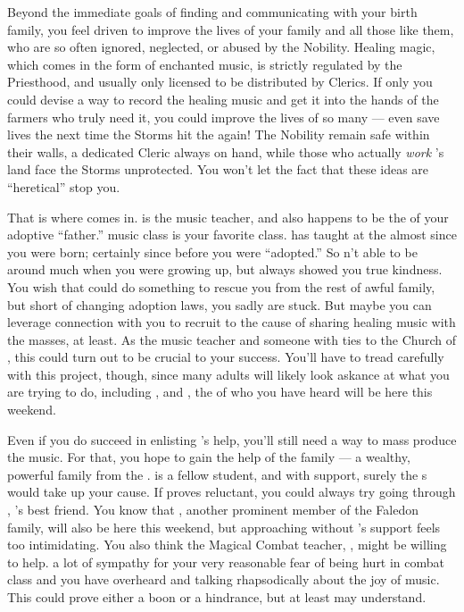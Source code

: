 \documentclass[char]{GL2020}
\begin{document}
Beyond the immediate goals of finding and communicating with your birth family, you feel driven to improve the lives of your family and all those like them, who are so often ignored, neglected, or abused by the Nobility. Healing magic, which comes in the form of enchanted music, is strictly regulated by the Priesthood, and usually only licensed to be distributed by Clerics. If only you could devise a way to record the healing music and get it into the hands of the farmers who truly need it, you could improve the lives of so many — even save lives the next time the Storms hit the \pFarm{} again! The Nobility remain safe within their walls, a dedicated Cleric always on hand, while those who actually \emph{work} \cFarmGod{}'s land face the Storms unprotected. You won't let the fact that these ideas are ``heretical'' stop you.

That is where \cMusic{\full} comes in. \cMusic{} is the music teacher, and also happens to be the \cMusic{\auncle} of your adoptive ``father.'' \cMusic{\Their} music class is your favorite class. \cMusic{} has taught at the \pSchool{} almost since you were born; certainly since before you were ``adopted.'' So \cMusic{\theywere}n’t able to be around much when you were growing up, but \cMusic{\they} always showed you true kindness. You wish that \cMusic{} could do something to rescue you from the rest of \cMusic{\their} awful family, but short of \cMusic{\them} changing adoption laws, you sadly are stuck. But maybe you can leverage \cMusic{\their} connection with you to recruit \cMusic{} to the cause of sharing healing music with the masses, at least. As the music teacher and someone with ties to the Church of \cFarmGod{}, this could turn out to be crucial to your success. You'll have to tread carefully with this project, though, since many adults will likely look askance at what you are trying to do, including \cMusic{} \cMusic{\themself}, and \cHedonist{\full}, the \cHedonist{\cleric} of \cFarmGod{} who you have heard will be here this weekend.

Even if you do succeed in enlisting \cMusic{}'s help, you'll still need a way to mass produce the music. For that, you hope to gain the help of the \cHeir{\formal} family — a wealthy, powerful family from the \pTech{}. \cHeir{\full} is a fellow student, and with \cHeir{\their} support, surely the \cHeir{\formal}s would take up your cause. If \cHeir{} proves reluctant, you could always try going through \cAmbition{\full}, \cHeir{}'s best friend. You know that \cDiplomat{\full}, another prominent member of the Faledon family, will also be here this weekend, but approaching \cDiplomat{\them} without \cHeir{}'s support feels too intimidating. You also think the Magical Combat teacher, \cInterpol{\full}, might be willing to help. \cInterpol{\Theyhave} a lot of sympathy for your very reasonable fear of being hurt in combat class and you have overheard \cMusic{} and \cInterpol{} talking rhapsodically about the joy of music. This could prove either a boon or a hindrance, but at least \cInterpol{\they} may understand.  
\end{document}
